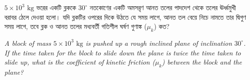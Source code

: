 \documentclass[12pt, a4paper]{article}
\begin{document}
\begin{tcolorbox}[questionbox={প্রশ্ন (Question) 10}]
\noindent
$5 \times 10^3\text{ kg}$ ভরের একটি ব্লককে $30^\circ$ নতকোণের একটি অমসরৃণ আনত তলের পাদদেশ থেকে তলের ঊর্ধ্বমুখী বরাবর ঠেলে দেওয়া হলো। যদি ব্লকটির ওপরের দিকে উঠতে যে সময় লাগে, আনত তল বেয়ে নিচে নামতে তার দ্বিগুণ সময় লাগে, তবে ব্লক ও আনত তলের মধ্যবর্তী গতিশীল ঘর্ষণ গুণাঙ্ক ($\mu_k$) কত?

\vspace{0.8em}
\begin{english}
\noindent\textit{\color{darkgray}
A block of mass $5 \times 10^3\text{ kg}$ is pushed up a rough inclined plane of inclination $30^\circ$. If the time taken for the block to slide down the plane is twice the time taken to slide up, what is the coefficient of kinetic friction ($\mu_k$) between the block and the plane?
}
\end{english}
\end{tcolorbox}
\end{document}

